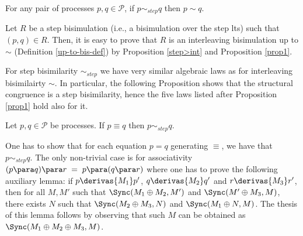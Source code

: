 \begin{proposition}\label{step->int}
For any pair of processes $p, q \in \mathcal{P}$, if $p \sim_{step} q$ then $p \sim q$.

\proof
Let $R$ be a step bisimulation (i.e., a bisimulation over the step lts) such that $(p, q) \in R$.
Then, it is easy to prove that $R$ is an interleaving bisimulation up to $\sim$ (Definition \ref{up-to-bis-def}) by
Proposition \ref{step>int} and Proposition \ref{prop1}. 
\fine
\end{proposition}

For step bisimilarity $\sim_{step}$ we have very similar algebraic laws as for interleaving bisimilairty $\sim$. 
In particular, the following Proposition shows that the structural congruence is a step bisimilarity, hence 
the five laws listed after Proposition \ref{prop1} hold also for it.

\begin{proposition}\label{cong>step}
Let $p, q \in {\mathcal P}$ be processes. If $p \equiv q$ then $p  \sim_{step} q$.

\proof One has to show that for each equation $p = q$ generating $\equiv$, we have that $p  \sim_{step} q$.
The only non-trivial case is for associativity $(p \para q) \para r \; = \; p \para (q \para r)$
where one has to prove the following auxiliary lemma: if $p  \derivas{M_1} p'$, $q  \derivas{M_2} q'$
and $r \derivas{M_3} r'$, then for all $M, M'$ such that $\Sync(M_1 \oplus M_2, M')$ and $\Sync(M' \oplus M_3, M)$,
there exists $N$ such that $\Sync(M_2 \oplus M_3, N)$ and $\Sync(M_1 \oplus N, M)$. 
The thesis of this lemma follows by observing that such $M$ can be obtained as $\Sync(M_1 \oplus M_2 \oplus M_3, M)$.
\fine
\end{proposition}

% 

